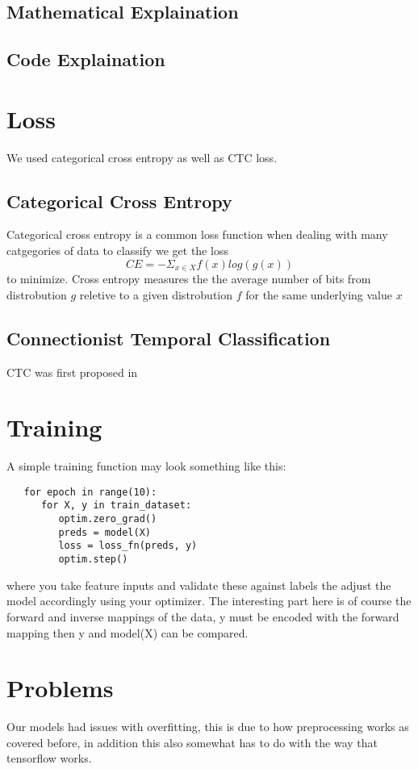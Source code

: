 \documentclass[11pt]{article}
\begin{document}
\subsection{Mathematical Explaination}
\subsection{Code Explaination}

\section{Loss}
We used categorical cross entropy as well as CTC loss.
\subsection{Categorical Cross Entropy}
Categorical cross entropy is a common loss function when dealing with many catgegories of data to classify we get the loss
$$
CE = -\Sigma_{x\in{}X} f(x)log(g(x))
$$
to minimize. Cross entropy measures the the average number of bits from distrobution $g$ reletive to a given distrobution $f$ for the same underlying value $x$ \cite{murphy2012}

\subsection{Connectionist Temporal Classification}
CTC was first proposed in \cite{graves2006}

\section{Training}
A simple training function may look something like this:
\begin{verbatim}
   for epoch in range(10):
      for X, y in train_dataset:
         optim.zero_grad()
         preds = model(X)
         loss = loss_fn(preds, y)
         optim.step()
\end{verbatim}
where you take feature inputs and validate these against labels the adjust the model accordingly using your optimizer. The interesting part here is of course the forward and inverse mappings of the data, y must be encoded with the forward mapping then y and model(X) can be compared.

\section{Problems}
Our models had issues with overfitting, this is due to how preprocessing works as covered before, in addition this also somewhat has to do with the way that tensorflow works.
\end{document}
